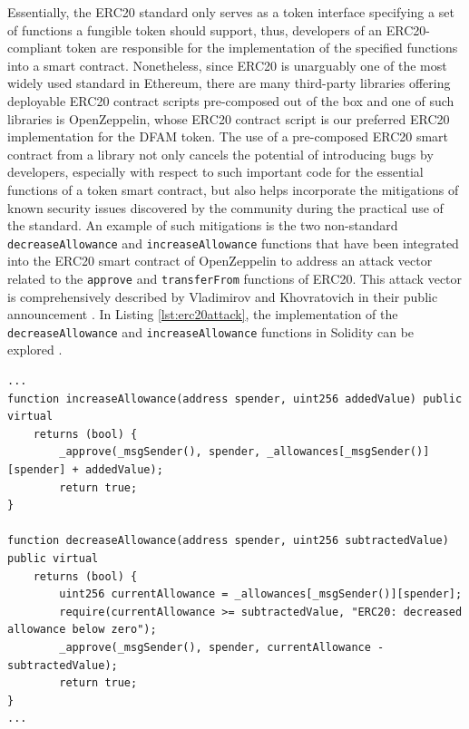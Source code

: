 Essentially, the ERC20 standard only serves as a token interface specifying a set of functions a fungible token should support, thus, developers of an ERC20-compliant token are responsible for the implementation of the specified functions into a smart contract. Nonetheless, since ERC20 is unarguably one of the most widely used standard in Ethereum, there are many third-party libraries offering deployable ERC20 contract scripts pre-composed out of the box and one of such libraries is OpenZeppelin, whose ERC20 contract script is our preferred ERC20 implementation for the DFAM token. The use of a pre-composed ERC20 smart contract from a library not only cancels the potential of introducing bugs by developers, especially with respect to such important code for the essential functions of a token smart contract, but also helps incorporate the mitigations of known security issues discovered by the community during the practical use of the standard. An example of such mitigations is the two non-standard \texttt{decreaseAllowance} and \texttt{increaseAllowance} functions that have been integrated into the ERC20 smart contract of OpenZeppelin to address an attack vector related to the \texttt{approve} and \texttt{transferFrom} functions of ERC20. This attack vector is comprehensively described by Vladimirov and Khovratovich in their public announcement \cite{vladimirov2018erc20}. In Listing \ref{lst:erc20attack}, the implementation of the \texttt{decreaseAllowance} and \texttt{increaseAllowance} functions in Solidity can be explored . \\


\begin{lstlisting}[language=Solidity, label={lst:erc20attack}, captionpos=b, caption={Solidity code of the \texttt{decreaseAllowance} and \texttt{increaseAllowance} functions for ERC20 from OpenZeppelin to mitigate the attack vector related to the \texttt{approve} function described in \cite{vladimirov2018erc20}\\}]
...
function increaseAllowance(address spender, uint256 addedValue) public virtual 
    returns (bool) {
        _approve(_msgSender(), spender, _allowances[_msgSender()][spender] + addedValue);
        return true;
}

function decreaseAllowance(address spender, uint256 subtractedValue) public virtual 
    returns (bool) {
        uint256 currentAllowance = _allowances[_msgSender()][spender];
        require(currentAllowance >= subtractedValue, "ERC20: decreased allowance below zero");
        _approve(_msgSender(), spender, currentAllowance - subtractedValue);
        return true;
}
...
\end{lstlisting}


